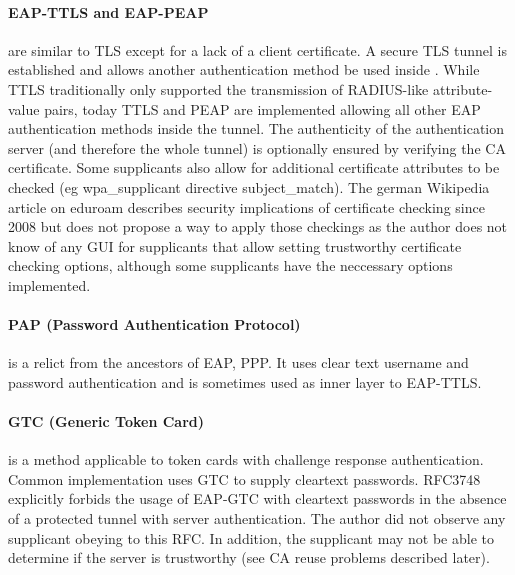 \documentclass[12pt,a4paper]{scrartcl}
\begin{document}
\paragraph{EAP-TTLS and EAP-PEAP} are similar to TLS except for a lack of a client certificate.
A secure TLS tunnel is established and allows another authentication method be used inside \cite{ttlspeap}.
While TTLS traditionally only supported the transmission of RADIUS-like attribute-value pairs, today TTLS and PEAP are implemented allowing all other EAP authentication methods inside the tunnel.
The authenticity of the authentication server (and therefore the whole tunnel) is optionally ensured by verifying the CA certificate.
Some supplicants also allow for additional certificate attributes to be checked (eg wpa\_supplicant directive subject\_match).
The german Wikipedia article on eduroam \cite{wiki-eduroam} describes security implications of certificate checking since 2008 but does not propose a way to apply those checkings as the author does not know of any GUI for supplicants that allow setting trustworthy certificate checking options, although some supplicants have the neccessary options implemented.

\paragraph{PAP (Password Authentication Protocol)} is a relict from the ancestors of EAP, PPP.
It uses clear text username and password authentication and is sometimes used as inner layer to EAP-TTLS.

\paragraph{GTC (Generic Token Card)} is a method applicable to token cards with challenge response authentication.
Common implementation uses GTC to supply cleartext passwords.
RFC3748 explicitly forbids the usage of EAP-GTC with cleartext passwords in the absence of a protected tunnel with server authentication. The author did not observe any supplicant obeying to this RFC. In addition, the supplicant may not be able to determine if the server is trustworthy (see CA reuse problems described later).
\end{document}
